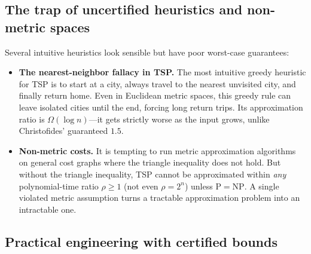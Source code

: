 \subsection{The trap of uncertified heuristics and non-metric spaces}

Several intuitive heuristics look sensible but have poor worst-case
guarantees:
\begin{itemize}
  \item \textbf{The nearest-neighbor fallacy in TSP.} The most intuitive greedy
        heuristic for TSP is to start at a city, always travel to the nearest
        unvisited city, and finally return home. Even in Euclidean metric spaces,
        this greedy rule can leave isolated cities until the end, forcing
        long return trips. Its approximation ratio is $\Omega(\log n)$---it gets
        strictly worse as the input grows, unlike Christofides' guaranteed $1.5$.
  \item \textbf{Non-metric costs.} It is tempting to run metric approximation
        algorithms on general cost graphs where the triangle inequality does not
        hold. But without the triangle inequality,
        \textsc{TSP} cannot be approximated within \emph{any} polynomial-time
        ratio $\rho \ge 1$ (not even $\rho = 2^n$) unless $\mathrm{P} = \mathrm{NP}$.
        A single violated metric assumption turns a tractable approximation problem
        into an intractable one.
\end{itemize}

\subsection{Practical engineering with certified bounds}

